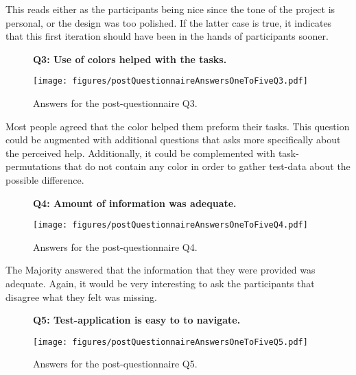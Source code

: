 %

    This reads either as the participants being nice since the tone of the
    project is personal, or the design was too polished. If the latter case
    is true, it indicates that this first iteration should have been in the
    hands of participants sooner.

    \begin{figure}[h!]
      \textbf{Q3: Use of colors helped with the tasks.}
      \begin{center}
        \texttt{[image: figures/postQuestionnaireAnswersOneToFiveQ3.pdf]}
        \caption{Answers for the post-questionnaire Q3.}
      \end{center}
    \end{figure}

    Most people agreed that the color helped them preform their tasks.
    This question could be augmented with additional questions that asks
    more specifically about the perceived help. Additionally, it could be
    complemented with task-permutations that do not contain any color
    in order to gather test-data about the possible difference.

    \begin{figure}[h!]
      \textbf{Q4: Amount of information was adequate.}
      \begin{center}
        \texttt{[image: figures/postQuestionnaireAnswersOneToFiveQ4.pdf]}
        \caption{Answers for the post-questionnaire Q4.}
      \end{center}
    \end{figure}

    The Majority answered that the information that they were provided was
    adequate. Again, it would be very interesting to ask the participants
    that disagree what they felt was missing.

    \begin{figure}[h!]
      \textbf{Q5: Test-application is easy to to navigate.}
      \begin{center}
        \texttt{[image: figures/postQuestionnaireAnswersOneToFiveQ5.pdf]}
        \caption{Answers for the post-questionnaire Q5.}
      \end{center}
    \end{figure}

